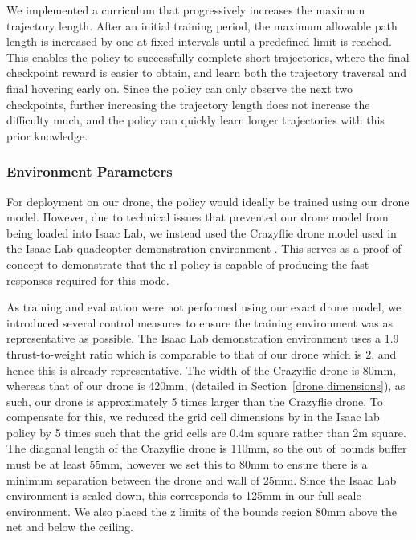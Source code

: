 \documentclass{report_template_oxford}
\begin{document}
We implemented a curriculum that progressively increases the maximum trajectory length. After an initial training period, the maximum allowable path length is increased by one at fixed intervals until a predefined limit is reached. This enables the policy to successfully complete short trajectories, where the final checkpoint reward is easier to obtain, and learn both the trajectory traversal and final hovering early on. Since the policy can only observe the next two checkpoints, further increasing the trajectory length does not increase the difficulty much, and the policy can quickly learn longer trajectories with this prior knowledge.

\subsubsection{Environment Parameters}
For deployment on our drone, the policy would ideally be trained using our drone model. However, due to technical issues that prevented our drone model from being loaded into Isaac Lab, we instead used the Crazyflie drone model used in the Isaac Lab quadcopter demonstration environment \cite{IsaacLabQuadcopter}. This serves as a proof of concept to demonstrate that the \gls{rl} policy is capable of producing the fast responses required for this mode.

As training and evaluation were not performed using our exact drone model, we introduced several control measures to ensure the training environment was as representative as possible. The Isaac Lab demonstration environment uses a 1.9 thrust-to-weight ratio which is comparable to that of our drone which is 2, and hence this is already representative. The width of the Crazyflie drone \cite{CrazyflieDatasheet} is 80mm, whereas that of our drone is 420mm, (detailed in Section~\ref{drone dimensions}), as such, our drone is approximately 5 times larger than the Crazyflie drone. To compensate for this, we reduced the grid cell dimensions by in the Isaac lab policy by 5 times such that the grid cells are 0.4m square rather than 2m square. The diagonal length of the Crazyflie drone is 110mm, so the out of bounds buffer must be at least 55mm, however we set this to 80mm to ensure there is a minimum separation between the drone and wall of 25mm. Since the Isaac Lab environment is scaled down, this corresponds to 125mm in our full scale environment. We also placed the z limits of the bounds region 80mm above the net and below the ceiling.
\end{document}
